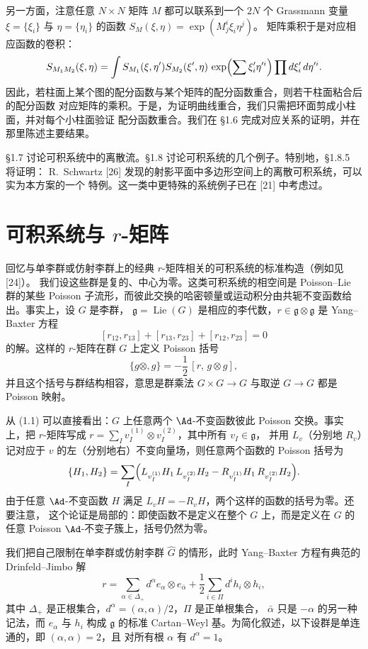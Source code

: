 另一方面，注意任意 $N\times N$ 矩阵 $M$ 都可以联系到一个 $2N$ 个 Grassmann 变量
$\xi=\{\xi_i\}$ 与 $\eta=\{\eta_i\}$ 的函数 $S_M(\xi,\eta)=\exp(M^i_j\xi_i\eta^j)$。
矩阵乘积于是对应相应函数的卷积：
\[
S_{M_1M_2}(\xi,\eta)=\int S_{M_1}(\xi,\eta')S_{M_2}(\xi',\eta)\,
\exp\Bigl(\sum \xi'_i\eta'^i\Bigr)\prod d\xi'_i\,d\eta'^i .
\]
因此，若柱面上某个图的配分函数与某个矩阵的配分函数重合，则若干柱面粘合后的配分函数
对应矩阵的乘积。于是，为证明曲线重合，我们只需把环面剪成小柱面，并对每个小柱面验证
配分函数重合。我们在 §1.6 完成对应关系的证明，并在那里陈述主要结果。

§1.7 讨论可积系统中的离散流。§1.8 讨论可积系统的几个例子。特别地，§1.8.5 将证明：
R.~Schwartz [26] 发现的射影平面中多边形空间上的离散可积系统，可以实为本方案的一个
特例。这一类中更特殊的系统例子已在 [21] 中考虑过。

\section{可积系统与 \texorpdfstring{$r$}{r}-矩阵}

回忆与单李群或仿射李群上的经典 $r$-矩阵相关的可积系统的标准构造（例如见 [24]）。
我们设这些群是复的、中心为零。这类可积系统的相空间是 Poisson--Lie 群的某些 Poisson
子流形，而彼此交换的哈密顿量或运动积分由共轭不变函数给出。事实上，设 $G$ 是李群，
$\mathfrak{g}=\operatorname{Lie}(G)$ 是相应的李代数，$r\in\mathfrak{g}\otimes\mathfrak{g}$
是 Yang--Baxter 方程
\[
[r_{12},r_{13}]+[r_{13},r_{23}]+[r_{12},r_{23}]=0
\]
的解。这样的 $r$-矩阵在群 $G$ 上定义 Poisson 括号
\begin{equation}
\{g\otimes,g\}=-\frac12\,[r,\,g\otimes g],\tag{1.1}\label{eq:1.1}
\end{equation}
并且这个括号与群结构相容，意思是群乘法 $G\times G\to G$ 与取逆 $G\to G$ 都是 Poisson
映射。

从 (1.1) 可以直接看出：$G$ 上任意两个 $\Ad$-不变函数彼此 Poisson 交换。事实上，把
$r$-矩阵写成 $r=\sum_I v_I^{(1)}\otimes v_I^{(2)}$，其中所有 $v_I\in\mathfrak{g}$，
并用 $L_v$（分别地 $R_v$）记对应于 $v$ 的左（分别地右）不变向量场，则任意两个函数的
Poisson 括号为
\[
\{H_1,H_2\}=\sum_I\Bigl(L_{v_I^{(1)}}H_1\,L_{v_I^{(2)}}H_2
-R_{v_I^{(1)}}H_1\,R_{v_I^{(2)}}H_2\Bigr).
\]
由于任意 $\Ad$-不变函数 $H$ 满足 $L_vH=-R_vH$，两个这样的函数的括号为零。还要注意，
这个论证是局部的：即使函数不是定义在整个 $G$ 上，而是定义在 $G$ 的任意 Poisson
$\Ad$-不变子簇上，括号仍然为零。

我们把自己限制在单李群或仿射李群 $\hat G$ 的情形，此时 Yang--Baxter 方程有典范的
Drinfeld--Jimbo 解
\begin{equation}
r=\sum_{\alpha\in\Delta_+}d^\alpha e_\alpha\otimes e_{\bar\alpha}
+\frac12\sum_{i\in\Pi}d^i h_i\otimes h_i,\tag{1.2}\label{eq:1.2}
\end{equation}
其中 $\Delta_+$ 是正根集合，$d^\alpha=(\alpha,\alpha)/2$，$\Pi$ 是正单根集合，
$\bar\alpha$ 只是 $-\alpha$ 的另一种记法，而 $e_\alpha$ 与 $h_i$ 构成 $\mathfrak{g}$
的标准 Cartan--Weyl 基。为简化叙述，以下设群是单连通的，即 $(\alpha,\alpha)=2$，且
对所有根 $\alpha$ 有 $d^\alpha=1$。

